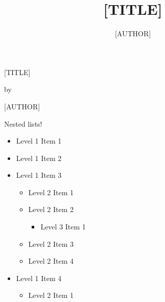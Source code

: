 \documentclass[
    12pt,
    letterpaper,
    oneside,
    noraggedright
]{turabian-researchpaper}
\title{{{[}TITLE{]}}}
\author{{{[}AUTHOR{]}}}
\makeatletter
\providecommand{\tightlist}{%
    \ifthenelse{\equal{\the\@listdepth}{1}}
    {}
    {\vspace{-\baselineskip}}
}
\makeatother
\begin{document}
    
        \begin{center}

        \thispagestyle{empty}
        \vspace*{1in}
        \begin{singlespace}
                {{[}TITLE{]}}
                \end{singlespace}
        \vspace{2in - \baselineskip}

        by
        \vspace{2in - \baselineskip}

        {{[}AUTHOR{]}}

        \vspace{2in - \baselineskip}

        \end{center}
        \newpage
    

Nested lists!

\begin{itemize}
\tightlist
\item
  Level 1 Item 1
\item
  Level 1 Item 2
\item
  Level 1 Item 3

  \begin{itemize}
  \tightlist
  \item
    Level 2 Item 1
  \item
    Level 2 Item 2

    \begin{itemize}
    \tightlist
    \item
      Level 3 Item 1
    \end{itemize}
  \item
    Level 2 Item 3
  \item
    Level 2 Item 4
  \end{itemize}
\item
  Level 1 Item 4

  \begin{itemize}
  \tightlist
  \item
    Level 2 Item 1
  \end{itemize}
\end{itemize}
\end{document}
